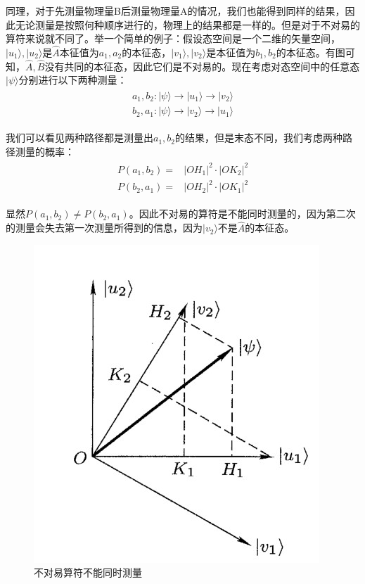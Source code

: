     同理，对于先测量物理量B后测量物理量A的情况，我们也能得到同样的结果，因此无论测量是按照何种顺序进行的，物理上的结果都是一样的。但是对于不对易的算符来说就不同了。举一个简单的例子：假设态空间是一个二维的矢量空间，$|u_1\rangle,|u_2\rangle$是$\hat{A}$本征值为$a_1,a_2$的本征态，$|v_1\rangle,|v_2\rangle$是本征值为$b_1,b_2$的本征态。有图可知，$\hat{A},\hat{B}$没有共同的本征态，因此它们是不对易的。现在考虑对态空间中的任意态$|\psi\rangle$分别进行以下两种测量：
    \begin{align}
        \begin{split}
            a_1,b_2:|\psi\rangle\rightarrow|u_1\rangle\rightarrow|v_2\rangle\\
            b_2,a_1:|\psi\rangle\rightarrow|v_2\rangle\rightarrow|u_1\rangle
        \end{split}
    \end{align}

    我们可以看见两种路径都是测量出$a_1,b_2$的结果，但是末态不同，我们考虑两种路径测量的概率：
    \begin{align}
        \begin{split}
            P(a_1,b_2)=&|OH_1|^2\cdot|OK_2|^2\\
            P(b_2,a_1)=&|OH_2|^2\cdot|OK_1|^2
        \end{split}
    \end{align}
    
    显然$P(a_1,b_2)\ne P(b_2,a_1)$。因此不对易的算符是不能同时测量的，因为第二次的测量会失去第一次测量所得到的信息，因为$|v_2\rangle$不是$\hat{A}$的本征态。
    \begin{figure}[H]
        \centering
        \includegraphics{figure/paradox.jpg}
        \caption{不对易算符不能同时测量}
        \label{fig:noncommuting}
    \end{figure}
